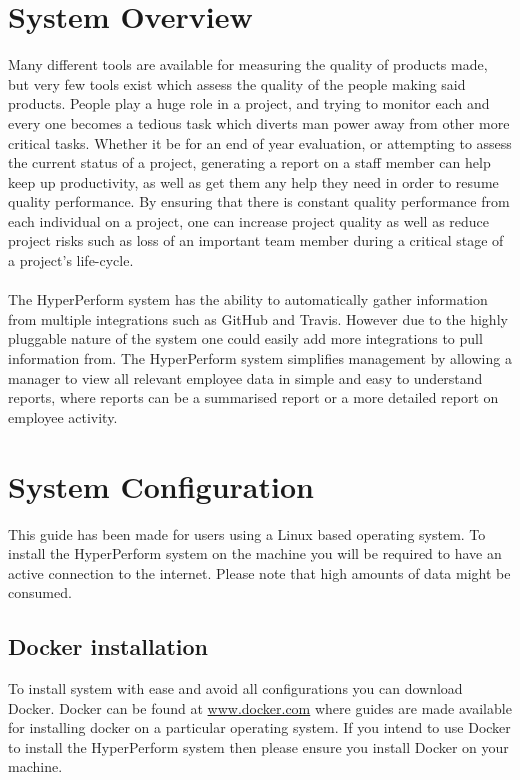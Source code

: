 \documentclass[11pt,a4paper]{article}
\begin{document}
	\thispagestyle{empty}
	\pagebreak
	
	\tableofcontents
	\pagebreak

\section{System Overview}
Many different tools are available for measuring the quality of products made, but very few tools exist which assess the quality of the people making said products. People play a huge role in a project, and trying to monitor each and every one becomes a tedious task which diverts man power away from other more critical tasks. Whether it be for an end of year evaluation, or attempting to assess the current status of a project, generating a report on a staff member can help keep up productivity, as well as get them any help they need in order to resume quality performance. By ensuring that there is constant quality performance from each individual on a project, one can increase project quality as well as reduce project risks such as loss of an important team member during a critical stage of a project's life-cycle. \\ \\
The HyperPerform system has the ability to automatically gather information from multiple integrations such as GitHub and Travis. However due to the highly pluggable nature of the system one could easily add more integrations to pull information from. The HyperPerform system simplifies management by allowing a manager to view all relevant employee data in simple and easy to understand reports, where reports can be a summarised report or a more detailed report on employee activity.

\section{System Configuration}
This guide has been made for users using a Linux based operating system. To install the HyperPerform system on the machine you will be required to have an active connection to the internet. Please note that high amounts of data might be consumed. 

\subsection{Docker installation}
To install system with ease and avoid all configurations you can download Docker. Docker can be found at \url{www.docker.com} where guides are made available for installing docker on a particular operating system. If you intend to use Docker to install the HyperPerform system then please ensure you install Docker on your machine.
\end{document}

